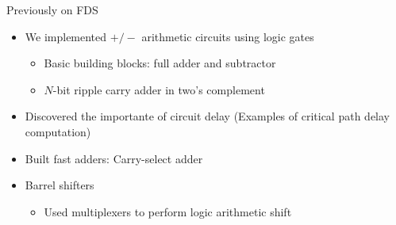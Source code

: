 
\begin{parag}{Previously on FDS}
\begin{itemize}
    \item We implemented $+/-$ arithmetic circuits using logic gates
        \begin{itemize}
            \item Basic building blocks: full adder and subtractor
            \item $N$-bit ripple carry adder in two's complement
        \end{itemize}
    \item Discovered the importante of circuit delay (Examples of critical path delay computation)
    \item Built fast adders: Carry-select adder
    \item Barrel shifters
        \begin{itemize}
            \item Used multiplexers to perform logic arithmetic shift
        \end{itemize}
\end{itemize}
\end{parag}

